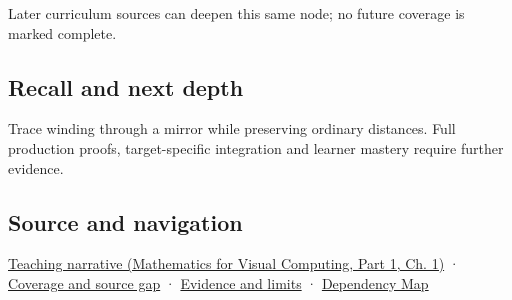 \hypertarget{appendix-87d7626c8d37-used-by}{}

Later curriculum sources can deepen this same node; no future coverage is marked complete.

\subsection{Recall and next depth}\label{appendix-87d7626c8d37-recall-and-next-depth}

\hypertarget{appendix-87d7626c8d37-recall-and-next-depth}{}

Trace winding through a mirror while preserving ordinary distances. Full production proofs, target-specific integration and learner mastery require further evidence.

\subsection{Source and navigation}\label{appendix-87d7626c8d37-source-and-navigation}

\hypertarget{appendix-87d7626c8d37-source-and-navigation}{}

\href{../02-Mathematics-for-Visual-Computing-P01/main.pdf\#nameddest=01-foundations-i-ch017-oriented-area-tells-us-which-side-of-the-panel-is-front}{Teaching narrative (Mathematics for Visual Computing, Part 1, Ch. 1)} · \hyperref[appendix-fd090d982a15-phase-6---parts-501-600]{Coverage and source gap} · \hyperref[appendix-a103e7846d21-phase-6---source-analysis-and-verification]{Evidence and limits} · \hyperref[appendix-4ad47bdd269a]{Dependency Map}
